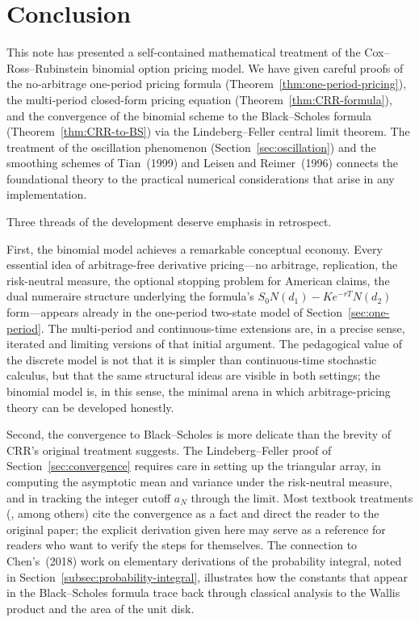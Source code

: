 \documentclass[11pt,a4paper]{article}
\newif\ifincludeempirical
\theoremstyle{plain}
\theoremstyle{definition}
\begin{document}
\ifincludeempirical
\section{Empirical Calibration on Equity Options}
\label{sec:empirical}
\fi

\section{Conclusion}
\label{sec:conclusion}

This note has presented a self-contained mathematical treatment of the
Cox--Ross--Rubinstein binomial option pricing model. We have given
careful proofs of the no-arbitrage one-period pricing formula
(Theorem~\ref{thm:one-period-pricing}), the multi-period closed-form
pricing equation (Theorem~\ref{thm:CRR-formula}), and the convergence
of the binomial scheme to the Black--Scholes formula
(Theorem~\ref{thm:CRR-to-BS}) via the Lindeberg--Feller central limit
theorem. The treatment of the oscillation phenomenon
(Section~\ref{sec:oscillation}) and the smoothing schemes of
Tian~(1999) and Leisen and Reimer~(1996) connects the foundational
theory to the practical numerical considerations that arise in any
implementation.

Three threads of the development deserve emphasis in retrospect.

First, the binomial model achieves a remarkable conceptual economy.
Every essential idea of arbitrage-free derivative pricing---no
arbitrage, replication, the risk-neutral measure, the optional
stopping problem for American claims, the dual numeraire structure
underlying the formula's $S_0 N(d_1) - K e^{-rT} N(d_2)$
form---appears already in the one-period two-state model of
Section~\ref{sec:one-period}. The multi-period and continuous-time
extensions are, in a precise sense, iterated and limiting versions of
that initial argument. The pedagogical value of the discrete model is
not that it is simpler than continuous-time stochastic calculus, but
that the same structural ideas are visible in both settings; the
binomial model is, in this sense, the minimal arena in which
arbitrage-pricing theory can be developed honestly.

Second, the convergence to Black--Scholes is more delicate than the
brevity of CRR's original treatment suggests. The Lindeberg--Feller
proof of Section~\ref{sec:convergence} requires care in setting up
the triangular array, in computing the asymptotic mean and variance
under the risk-neutral measure, and in tracking the integer cutoff
$a_N$ through the limit. Most textbook treatments
(\citealp{Hull2017, Shreve2004}, among others) cite the convergence as
a fact and direct the reader to the original paper; the explicit
derivation given here may serve as a reference for readers who want to
verify the steps for themselves. The connection to Chen's~(2018) work
on elementary derivations of the probability integral, noted in
Section~\ref{subsec:probability-integral}, illustrates how the
constants that appear in the Black--Scholes formula trace back through
classical analysis to the Wallis product and the area of the unit
disk.
\end{document}
